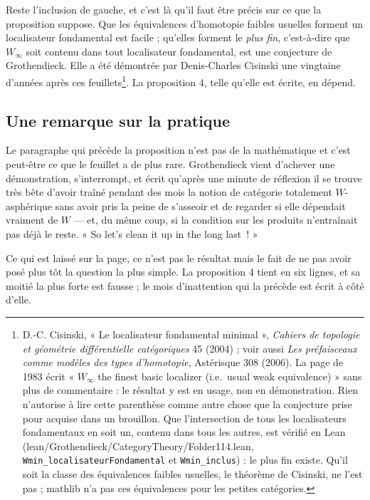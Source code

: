 \documentclass[11pt,a4paper]{article}
\begin{document}
Reste l'inclusion de gauche, et c'est là qu'il faut être précis sur ce que la
proposition suppose. Que les équivalences d'homotopie faibles usuelles forment
un localisateur fondamental est facile ; qu'elles forment le \emph{plus fin},
c'est-à-dire que $W_{\infty}$ soit contenu dans tout localisateur fondamental,
est une conjecture de Grothendieck. Elle a été démontrée par Denis-Charles
Cisinski une vingtaine d'années après ces feuillets\footnote{D.-C. Cisinski,
« Le localisateur fondamental minimal », \emph{Cahiers de topologie et géométrie
différentielle catégoriques} 45 (2004) ; voir aussi \emph{Les préfaisceaux comme
modèles des types d'homotopie}, Astérisque 308 (2006). La page de 1983 écrit
« $W_{\infty}$ the finest basic localizer (i.e.\ usual weak equivalence) » sans
plus de commentaire : le résultat y est en usage, non en démonstration. Rien
n'autorise à lire cette parenthèse comme autre chose que la conjecture prise
pour acquise dans un brouillon. Que l'intersection de tous les localisateurs
fondamentaux en soit un, contenu dans tous les autres, est vérifié en Lean
(lean/Grothendieck/CategoryTheory/Folder114.lean, \texttt{Wmin\_localisateurFondamental} et
\texttt{Wmin\_inclus}) : le plus fin existe. Qu'il soit la classe des
équivalences faibles usuelles, le théorème de Cisinski, ne l'est pas ; mathlib
n'a pas ces équivalences pour les petites catégories.}. La proposition 4, telle qu'elle est écrite,
en dépend.

\subsection*{Une remarque sur la pratique}

Le paragraphe qui précède la proposition n'est pas de la mathématique et c'est
peut-être ce que le feuillet a de plus rare. Grothendieck vient d'achever une
démonstration, s'interrompt, et écrit qu'après une minute de réflexion il se
trouve très bête d'avoir traîné pendant des mois la notion de catégorie
totalement $W$-asphérique sans avoir pris la peine de s'asseoir et de regarder
si elle dépendait vraiment de $W$ — et, du même coup, si la condition sur les
produits n'entraînait pas déjà le reste. « So let's clean it up in the long
last~! »

Ce qui est laissé sur la page, ce n'est pas le résultat mais le fait de ne pas
avoir posé plus tôt la question la plus simple. La proposition 4 tient en six
lignes, et sa moitié la plus forte est fausse ; le mois d'inattention qui la
précède est écrit à côté d'elle.
\end{document}
